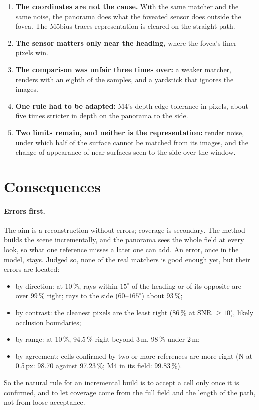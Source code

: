 \documentclass[11pt,a4paper]{article}
\newcommand{\mt}{M\"obius traces}
\begin{document}
\begin{enumerate}
\item \textbf{The coordinates are not the cause.} With the same matcher and the same noise, the panorama does what the
  foveated sensor does outside the fovea. The \mt{} representation is cleared on the straight path.
\item \textbf{The sensor matters only near the heading,} where the fovea's finer pixels win.
\item \textbf{The comparison was unfair three times over:} a weaker matcher, renders with an eighth of the samples, and a yardstick
  that ignores the images.
\item \textbf{One rule had to be adapted:} M4's depth-edge tolerance in pixels, about five times stricter in depth on the
  panorama to the side.
\item \textbf{Two limits remain, and neither is the representation:} render noise, under which half of the surface cannot be
  matched from its images, and the change of appearance of near surfaces seen to the side over the window.
\end{enumerate}

\section{Consequences}\label{sec:consequences}

\paragraph{Errors first.} The aim is a reconstruction without errors; coverage is secondary. The method builds the scene
incrementally, and the panorama sees the whole field at every look, so what one reference misses a later one can add. An
error, once in the model, stays. Judged so, none of the real matchers is good enough yet, but their errors are located:
\begin{itemize}
\item by direction: at 10\,\%, rays within $15^\circ$ of the heading or of its opposite are over 99\,\% right; rays to the
  side ($60$--$165^\circ$) about 93\,\%;
\item by contrast: the cleanest pixels are the least right (86\,\% at SNR $\ge10$), likely occlusion boundaries;
\item by range: at 10\,\%, 94.5\,\% right beyond 3\,m, 98\,\% under 2\,m;
\item by agreement: cells confirmed by two or more references are more right (N at 0.5\,px: 98.70 against 97.23\,\%; M4 in its
  field: 99.83\,\%).
\end{itemize}
So the natural rule for an incremental build is to accept a cell only once it is confirmed, and to let coverage come from
the full field and the length of the path, not from loose acceptance.
\end{document}
